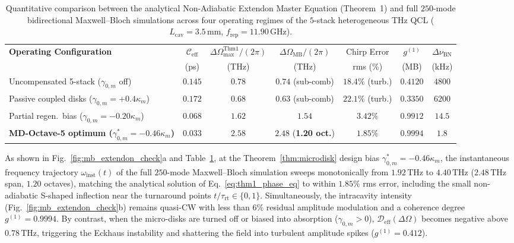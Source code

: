 \documentclass[11pt,letterpaper]{article}
\begin{document}
\begin{table}[t!]
\centering
\caption{Quantitative comparison between the analytical Non-Adiabatic Extendon Master Equation (Theorem~1) and full $250$-mode bidirectional Maxwell--Bloch simulations across four operating regimes of the $5$-stack heterogeneous THz QCL ($L_{\mathrm{cav}} = 3.5\,\mathrm{mm}$, $f_{\mathrm{rep}} = 11.90\,\mathrm{GHz}$).}
\vspace{6pt}
\footnotesize
\begin{tabular}{@{}lcccccc@{}}
\toprule
\textbf{Operating Configuration} & $\mathcal{C}_{\mathrm{eff}}$ & $\Delta\Omega_{\max}^{\mathrm{Thm1}}/(2\pi)$ & $\Delta\Omega_{\mathrm{MB}}/(2\pi)$ & Chirp Error & $g^{(1)}$ & $\Delta\nu_{\mathrm{BN}}$ \\
 & (ps) & (THz) & (THz) & rms (\%) & (MB) & (kHz) \\
\midrule
Uncompensated 5-stack ($\gamma_{0,m}$ off) & $0.145$ & $0.78$ & $0.74$ (sub-comb) & $18.4\%$ (turb.) & $0.4120$ & $4800$ \\
Passive coupled disks ($\gamma_{0,m} = +0.4\kappa_m$) & $0.172$ & $0.68$ & $0.63$ (sub-comb) & $22.1\%$ (turb.) & $0.3350$ & $6200$ \\
Partial regen.\ bias ($\gamma_{0,m} = -0.20\kappa_m$) & $0.068$ & $1.62$ & $1.54$ & $3.42\%$ & $0.9912$ & $14.5$ \\
\textbf{MD-Octave-5 optimum ($\gamma_{0,m}^* = -0.46\kappa_m$)} & $\mathbf{0.033}$ & $\mathbf{2.58}$ & $\mathbf{2.48}$ (\textbf{1.20 oct.}) & $\mathbf{1.85\%}$ & $\mathbf{0.9994}$ & $\mathbf{1.8}$ \\
\bottomrule
\end{tabular}
\label{tab:mb_extendon_table}
\end{table}

As shown in Fig.~\ref{fig:mb_extendon_check}a and Table~\ref{tab:mb_extendon_table}, at the Theorem~\ref{thm:microdisk} design bias $\gamma_{0,m}^* = -0.46\kappa_m$, the instantaneous frequency trajectory $\omega_{\mathrm{inst}}(t)$ of the full $250$-mode Maxwell--Bloch simulation sweeps monotonically from $1.92\,\mathrm{THz}$ to $4.40\,\mathrm{THz}$ ($2.48\,\mathrm{THz}$ span, $1.20$ octaves), matching the analytical solution of Eq.~\eqref{eq:thm1_phase_eq} to within $1.85\%$ rms error, including the small non-adiabatic S-shaped inflection near the turnaround points $t/\tau_{\mathrm{rt}} \in \{0, 1\}$. Simultaneously, the intracavity intensity (Fig.~\ref{fig:mb_extendon_check}b) remains quasi-CW with less than $6\%$ residual amplitude modulation and a coherence degree $g^{(1)} = 0.9994$. By contrast, when the micro-disks are turned off or biased into absorption ($\gamma_{0,m} > 0$), $\mathcal{D}_{\mathrm{eff}}(\Delta\Omega)$ becomes negative above $0.78\,\mathrm{THz}$, triggering the Eckhaus instability and shattering the field into turbulent amplitude spikes ($g^{(1)} = 0.412$).
\end{document}
